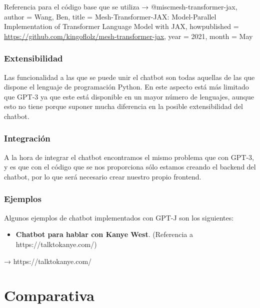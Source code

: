 Referencia para el código base que se utiliza → @misc{mesh-transformer-jax,
  author = {Wang, Ben},
  title = {{Mesh-Transformer-JAX: Model-Parallel Implementation of Transformer Language Model with JAX}},
  howpublished = {\url{https://github.com/kingoflolz/mesh-transformer-jax}},
  year = 2021,
  month = May
}


\subsubsection*{Extensibilidad}

Las funcionalidad a las que se puede unir el chatbot son todas aquellas de las que dispone el lenguaje de programación Python. En este aspecto está más limitado que GPT-3 ya que este está disponible en un mayor número de lenguajes, aunque esto no tiene porque suponer mucha diferencia en la posible extensibilidad del chatbot.

\subsubsection*{Integración}

A la hora de integrar el chatbot encontramos el mismo problema que con GPT-3, y es que con el código que se nos proporciona sólo estamos creando el backend del chatbot, por lo que será necesario crear nuestro propio frontend.

\subsubsection*{Ejemplos}

Algunos ejemplos de chatbot implementados con GPT-J son los siguientes:

\begin{itemize}
    \item \textbf{Chatbot para hablar con Kanye West}. (Referencia a https://talktokanye.com/)
\end{itemize}



→ https://talktokanye.com/





\section{Comparativa}

